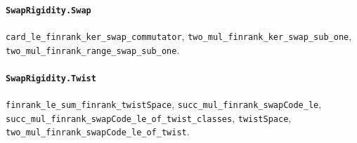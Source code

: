\paragraph{\texttt{SwapRigidity.Swap}}
{\small\raggedright \texttt{card\_le\_finrank\_ker\_swap\_commutator}, \texttt{two\_mul\_finrank\_ker\_swap\_sub\_one}, \texttt{two\_mul\_finrank\_range\_swap\_sub\_one}.\par}

\paragraph{\texttt{SwapRigidity.Twist}}
{\small\raggedright \texttt{finrank\_le\_sum\_finrank\_twistSpace}, \texttt{succ\_mul\_finrank\_swapCode\_le}, \texttt{succ\_mul\_finrank\_swapCode\_le\_of\_twist\_classes}, \texttt{twistSpace}, \texttt{two\_mul\_finrank\_swapCode\_le\_of\_twist}.\par}
